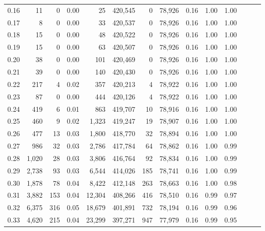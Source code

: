 \begin{tabular}{rrrrrrrrrrrrrr}
0.16 &      11 &      0 &  0.00 &       25 &  420,545 &       0 &  78,926 &  0.16 &  1.00 &      1.00 \\
0.17 &       8 &      0 &  0.00 &       33 &  420,537 &       0 &  78,926 &  0.16 &  1.00 &      1.00 \\
0.18 &      15 &      0 &  0.00 &       48 &  420,522 &       0 &  78,926 &  0.16 &  1.00 &      1.00 \\
0.19 &      15 &      0 &  0.00 &       63 &  420,507 &       0 &  78,926 &  0.16 &  1.00 &      1.00 \\
0.20 &      38 &      0 &  0.00 &      101 &  420,469 &       0 &  78,926 &  0.16 &  1.00 &      1.00 \\
0.21 &      39 &      0 &  0.00 &      140 &  420,430 &       0 &  78,926 &  0.16 &  1.00 &      1.00 \\
0.22 &     217 &      4 &  0.02 &      357 &  420,213 &       4 &  78,922 &  0.16 &  1.00 &      1.00 \\
0.23 &      87 &      0 &  0.00 &      444 &  420,126 &       4 &  78,922 &  0.16 &  1.00 &      1.00 \\
0.24 &     419 &      6 &  0.01 &      863 &  419,707 &      10 &  78,916 &  0.16 &  1.00 &      1.00 \\
0.25 &     460 &      9 &  0.02 &    1,323 &  419,247 &      19 &  78,907 &  0.16 &  1.00 &      1.00 \\
0.26 &     477 &     13 &  0.03 &    1,800 &  418,770 &      32 &  78,894 &  0.16 &  1.00 &      1.00 \\
0.27 &     986 &     32 &  0.03 &    2,786 &  417,784 &      64 &  78,862 &  0.16 &  1.00 &      0.99 \\
0.28 &   1,020 &     28 &  0.03 &    3,806 &  416,764 &      92 &  78,834 &  0.16 &  1.00 &      0.99 \\
0.29 &   2,738 &     93 &  0.03 &    6,544 &  414,026 &     185 &  78,741 &  0.16 &  1.00 &      0.99 \\
0.30 &   1,878 &     78 &  0.04 &    8,422 &  412,148 &     263 &  78,663 &  0.16 &  1.00 &      0.98 \\
0.31 &   3,882 &    153 &  0.04 &   12,304 &  408,266 &     416 &  78,510 &  0.16 &  0.99 &      0.97 \\
0.32 &   6,375 &    316 &  0.05 &   18,679 &  401,891 &     732 &  78,194 &  0.16 &  0.99 &      0.96 \\
0.33 &   4,620 &    215 &  0.04 &   23,299 &  397,271 &     947 &  77,979 &  0.16 &  0.99 &      0.95 \\

\end{tabular}
